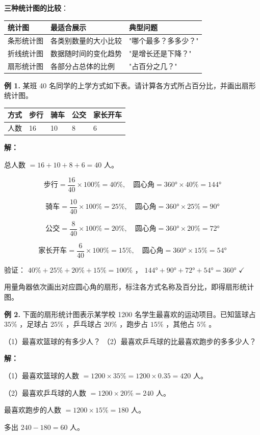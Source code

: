\begin{understand}
\textbf{三种统计图的比较}：

\begin{center}
\begin{tabular}{lll}
\toprule
统计图 & 最适合展示 & 典型问题 \\
\midrule
条形统计图 & 各类别数量的大小比较 & "哪个最多？多多少？" \\
折线统计图 & 数据随时间的变化趋势 & "是增长还是下降？" \\
扇形统计图 & 各部分占总体的比例 & "占百分之几？" \\
\bottomrule
\end{tabular}
\end{center}


\end{understand}

\begin{workedexamples}


\textbf{例 1.} 某班 40 名同学的上学方式如下表。请计算各方式所占百分比，并画出扇形统计图。

\begin{center}
\begin{tabular}{lllll}
\toprule
方式 & 步行 & 骑车 & 公交 & 家长开车 \\
\midrule
人数 & 16 & 10 & 8 & 6 \\
\bottomrule
\end{tabular}
\end{center}


\textbf{解：}

总人数 $= 16 + 10 + 8 + 6 = 40$ 人。

\[
\text{步行} = \frac{16}{40} \times 100\% = 40\%, \quad \text{圆心角} = 360° \times 40\% = 144°
\]


\[
\text{骑车} = \frac{10}{40} \times 100\% = 25\%, \quad \text{圆心角} = 360° \times 25\% = 90°
\]


\[
\text{公交} = \frac{8}{40} \times 100\% = 20\%, \quad \text{圆心角} = 360° \times 20\% = 72°
\]


\[
\text{家长开车} = \frac{6}{40} \times 100\% = 15\%, \quad \text{圆心角} = 360° \times 15\% = 54°
\]


验证： $40\% + 25\% + 20\% + 15\% = 100\%$ ， $144° + 90° + 72° + 54° = 360°$ $\checkmark$

用量角器依次画出对应圆心角的扇形，标注各方式名称及百分比，即得扇形统计图。

\textbf{例 2.} 下面的扇形统计图表示某学校 1200 名学生最喜欢的运动项目。已知篮球占 $35\%$ ，足球占 $25\%$ ，乒乓球占 $20\%$ ，跑步占 $15\%$ ，其他占 $5\%$ 。

（1）最喜欢篮球的有多少人？
（2）最喜欢乒乓球的比最喜欢跑步的多多少人？

\textbf{解：}

（1）最喜欢篮球的人数 $= 1200 \times 35\% = 1200 \times 0.35 = 420$ 人。

（2）最喜欢乒乓球的人数 $= 1200 \times 20\% = 240$ 人。

最喜欢跑步的人数 $= 1200 \times 15\% = 180$ 人。

多出 $240 - 180 = 60$ 人。

\end{workedexamples}

